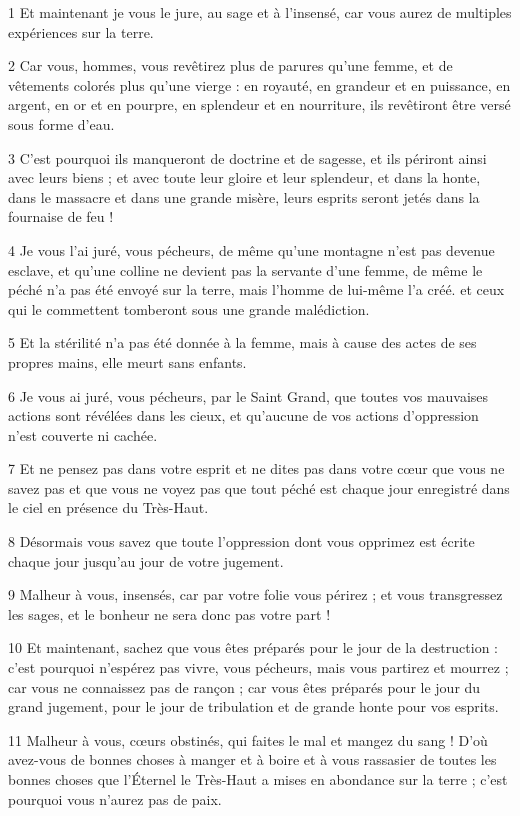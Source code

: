 \par 1 Et maintenant je vous le jure, au sage et à l'insensé, car vous aurez de multiples expériences sur la terre.
\par 2 Car vous, hommes, vous revêtirez plus de parures qu'une femme, et de vêtements colorés plus qu'une vierge : en royauté, en grandeur et en puissance, en argent, en or et en pourpre, en splendeur et en nourriture, ils revêtiront être versé sous forme d'eau.
\par 3 C'est pourquoi ils manqueront de doctrine et de sagesse, et ils périront ainsi avec leurs biens ; et avec toute leur gloire et leur splendeur, et dans la honte, dans le massacre et dans une grande misère, leurs esprits seront jetés dans la fournaise de feu !
\par 4 Je vous l'ai juré, vous pécheurs, de même qu'une montagne n'est pas devenue esclave, et qu'une colline ne devient pas la servante d'une femme, de même le péché n'a pas été envoyé sur la terre, mais l'homme de lui-même l'a créé. et ceux qui le commettent tomberont sous une grande malédiction.
\par 5 Et la stérilité n'a pas été donnée à la femme, mais à cause des actes de ses propres mains, elle meurt sans enfants.
\par 6 Je vous ai juré, vous pécheurs, par le Saint Grand, que toutes vos mauvaises actions sont révélées dans les cieux, et qu'aucune de vos actions d'oppression n'est couverte ni cachée.
\par 7 Et ne pensez pas dans votre esprit et ne dites pas dans votre cœur que vous ne savez pas et que vous ne voyez pas que tout péché est chaque jour enregistré dans le ciel en présence du Très-Haut.
\par 8 Désormais vous savez que toute l'oppression dont vous opprimez est écrite chaque jour jusqu'au jour de votre jugement.
\par 9 Malheur à vous, insensés, car par votre folie vous périrez ; et vous transgressez les sages, et le bonheur ne sera donc pas votre part !
\par 10 Et maintenant, sachez que vous êtes préparés pour le jour de la destruction : c'est pourquoi n'espérez pas vivre, vous pécheurs, mais vous partirez et mourrez ; car vous ne connaissez pas de rançon ; car vous êtes préparés pour le jour du grand jugement, pour le jour de tribulation et de grande honte pour vos esprits.
\par 11 Malheur à vous, cœurs obstinés, qui faites le mal et mangez du sang ! D'où avez-vous de bonnes choses à manger et à boire et à vous rassasier de toutes les bonnes choses que l'Éternel le Très-Haut a mises en abondance sur la terre ; c'est pourquoi vous n'aurez pas de paix.
